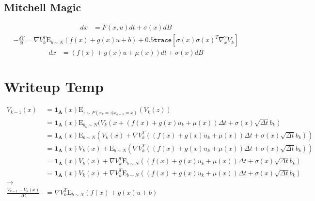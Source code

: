 \documentclass[a4paper]{article}
\begin{document}
  \subsection{Mitchell Magic}

  \begin{align*}
  dx &= F(x,u) dt + \sigma(x) dB
  \end{align*}
  \begin{align*}
  -\frac{\delta V}{\delta t} = \nabla V_k^T \mathrm{E}_{b\sim N} ( f(x) + g(x) u + b ) + 0.5 \texttt{trace} [\sigma(x) \sigma(x)^T \nabla^2_x V_k]
  \end{align*}
  \begin{align*}
  dx &= (f(x) + g(x) u + \mu(x) ) dt + \sigma(x) dB
  \end{align*}

\section{Writeup Temp}

\begin{align}
V_{k-1}(x) & = \mathbf{1_A}(x) \mathrm{E}_{z \sim P(x_k = z | x_{k-1}=x)} (V_k(z))
\\ & = \mathbf{1_A}(x) \mathrm{E}_{b_k\sim N} (V_k( x + (f(x) + g(x) u_k + \mu(x)) \Delta t + \sigma(x) \sqrt{\Delta t} b_k )
\\ & = \mathbf{1_A}(x) \mathrm{E}_{b\sim N} (V_k( x ) + \nabla V_k^T ((f(x) + g(x) u_k + \mu(x)) \Delta t + \sigma(x) \sqrt{\Delta t} b_k) )
\\ & = \mathbf{1_A}(x) V_k(x) + \mathrm{E}_{b\sim N} ( \nabla V_k^T ( (f(x) + g(x) u_k + \mu(x)) \Delta t + \sigma(x) \sqrt{\Delta t} b_k)  )
\\ & = \mathbf{1_A}(x) V_k(x) + \nabla V_k^T \mathrm{E}_{b\sim N}   ( (f(x) + g(x) u_k + \mu(x)) \Delta t + \sigma(x) \sqrt{\Delta t} b_k)
\\ & = \mathbf{1_A}(x) V_k(x) + \nabla V_k^T \mathrm{E}_{b\sim N}   ( (f(x) + g(x) u_k + \mu(x)) \Delta t + \sigma(x) \sqrt{\Delta t} b_k)
\\ \rightarrow
\\ \frac{V_{k-1} - V_k(x)}{\Delta t} &= \nabla V_k^T \mathrm{E}_{b\sim N} ( f(x) + g(x) u + b )
\end{align}
\end{document}
